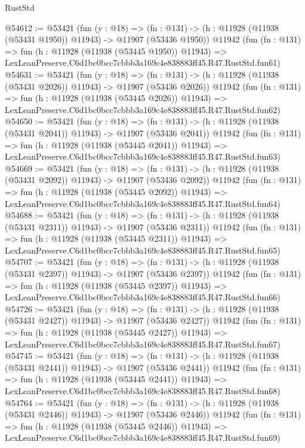\begin{lexlean}{RustStd}
\begin{coremodule}
@54612 := @53421
    (fun (y : @18) =>
    (fn : @131) -> (h : @11928 (@11938 (@53431 @1950)) @11943) -> @11907 (@53436 @1950))
    @11942
    (fun (fn : @131) =>
    fun (h : @11928 (@11938 (@53445 @1950)) @11943) =>
    LexLeanPreserve.C6d1bc0bcc7cbbb3a169c4e838883ff45.R47.RustStd.fun61)
@54631 := @53421
    (fun (y : @18) =>
    (fn : @131) -> (h : @11928 (@11938 (@53431 @2026)) @11943) -> @11907 (@53436 @2026))
    @11942
    (fun (fn : @131) =>
    fun (h : @11928 (@11938 (@53445 @2026)) @11943) =>
    LexLeanPreserve.C6d1bc0bcc7cbbb3a169c4e838883ff45.R47.RustStd.fun62)
@54650 := @53421
    (fun (y : @18) =>
    (fn : @131) -> (h : @11928 (@11938 (@53431 @2041)) @11943) -> @11907 (@53436 @2041))
    @11942
    (fun (fn : @131) =>
    fun (h : @11928 (@11938 (@53445 @2041)) @11943) =>
    LexLeanPreserve.C6d1bc0bcc7cbbb3a169c4e838883ff45.R47.RustStd.fun63)
@54669 := @53421
    (fun (y : @18) =>
    (fn : @131) -> (h : @11928 (@11938 (@53431 @2092)) @11943) -> @11907 (@53436 @2092))
    @11942
    (fun (fn : @131) =>
    fun (h : @11928 (@11938 (@53445 @2092)) @11943) =>
    LexLeanPreserve.C6d1bc0bcc7cbbb3a169c4e838883ff45.R47.RustStd.fun64)
@54688 := @53421
    (fun (y : @18) =>
    (fn : @131) -> (h : @11928 (@11938 (@53431 @2311)) @11943) -> @11907 (@53436 @2311))
    @11942
    (fun (fn : @131) =>
    fun (h : @11928 (@11938 (@53445 @2311)) @11943) =>
    LexLeanPreserve.C6d1bc0bcc7cbbb3a169c4e838883ff45.R47.RustStd.fun65)
@54707 := @53421
    (fun (y : @18) =>
    (fn : @131) -> (h : @11928 (@11938 (@53431 @2397)) @11943) -> @11907 (@53436 @2397))
    @11942
    (fun (fn : @131) =>
    fun (h : @11928 (@11938 (@53445 @2397)) @11943) =>
    LexLeanPreserve.C6d1bc0bcc7cbbb3a169c4e838883ff45.R47.RustStd.fun66)
@54726 := @53421
    (fun (y : @18) =>
    (fn : @131) -> (h : @11928 (@11938 (@53431 @2427)) @11943) -> @11907 (@53436 @2427))
    @11942
    (fun (fn : @131) =>
    fun (h : @11928 (@11938 (@53445 @2427)) @11943) =>
    LexLeanPreserve.C6d1bc0bcc7cbbb3a169c4e838883ff45.R47.RustStd.fun67)
@54745 := @53421
    (fun (y : @18) =>
    (fn : @131) -> (h : @11928 (@11938 (@53431 @2441)) @11943) -> @11907 (@53436 @2441))
    @11942
    (fun (fn : @131) =>
    fun (h : @11928 (@11938 (@53445 @2441)) @11943) =>
    LexLeanPreserve.C6d1bc0bcc7cbbb3a169c4e838883ff45.R47.RustStd.fun68)
@54764 := @53421
    (fun (y : @18) =>
    (fn : @131) -> (h : @11928 (@11938 (@53431 @2446)) @11943) -> @11907 (@53436 @2446))
    @11942
    (fun (fn : @131) =>
    fun (h : @11928 (@11938 (@53445 @2446)) @11943) =>
    LexLeanPreserve.C6d1bc0bcc7cbbb3a169c4e838883ff45.R47.RustStd.fun69)

\end{coremodule}
\end{lexlean}
